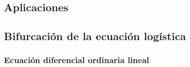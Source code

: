 \begin{partbacktext}
\part{Aplicaciones}

\end{partbacktext}
\chapter{Bifurcación de la ecuación logística}
\section{Ecuación diferencial ordinaria lineal}